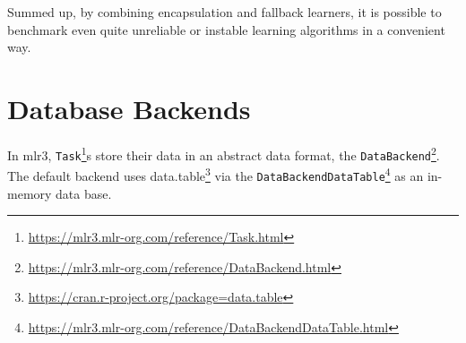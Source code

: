 \documentclass[12pt,]{scrbook}
\newenvironment{Shaded}{}{}
\newcommand{\CommentTok}[1]{\textcolor[rgb]{0.00,0.50,0.00}{#1}}
\newcommand{\DataTypeTok}[1]{#1}
\newcommand{\FloatTok}[1]{#1}
\newcommand{\KeywordTok}[1]{\textcolor[rgb]{0.00,0.00,1.00}{#1}}
\newcommand{\NormalTok}[1]{#1}
\newcommand{\OperatorTok}[1]{#1}
\newcommand{\StringTok}[1]{\textcolor[rgb]{0.00,0.50,0.50}{#1}}
\renewcommand{\href}[2]{#2\footnote{\url{#1}}}
\begin{document}
\begin{Shaded}
\end{Shaded}

Summed up, by combining encapsulation and fallback learners, it is possible to benchmark even quite unreliable or instable learning algorithms in a convenient way.

\hypertarget{backends}{%
\section{Database Backends}\label{backends}}

In mlr3, \href{https://mlr3.mlr-org.com/reference/Task.html}{\texttt{Task}}s store their data in an abstract data format, the \href{https://mlr3.mlr-org.com/reference/DataBackend.html}{\texttt{DataBackend}}.
The default backend uses \href{https://cran.r-project.org/package=data.table}{data.table} via the \href{https://mlr3.mlr-org.com/reference/DataBackendDataTable.html}{\texttt{DataBackendDataTable}} as an in-memory data base.
\end{document}
